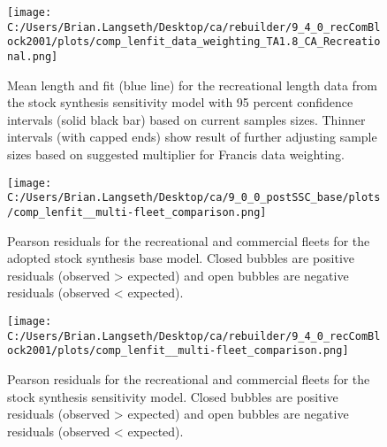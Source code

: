 \documentclass[11pt,
  english,
  letterpaper,
]{article}
\begin{document}
\tagmcend\tagstructend


\begin{figure}
\centering
\texttt{[image: C:/Users/Brian.Langseth/Desktop/ca/rebuilder/9\_4\_0\_recComBlock2001/plots/comp\_lenfit\_data\_weighting\_TA1.8\_CA\_Recreational.png]}
\caption{Mean length and fit (blue line) for the recreational length data from the stock synthesis sensitivity model with 95 percent confidence intervals (solid black bar) based on current samples sizes. Thinner intervals (with capped ends) show result of further adjusting sample sizes based on suggested multiplier for Francis data weighting.\label{fig:MeanLengthFit-rec-sens}}
\end{figure}

\tagmcend\tagstructend


\begin{figure}
\centering
\texttt{[image: C:/Users/Brian.Langseth/Desktop/ca/9\_0\_0\_postSSC\_base/plots/comp\_lenfit\_\_multi-fleet\_comparison.png]}
\caption{Pearson residuals for the recreational and commercial fleets for the adopted stock synthesis base model. Closed bubbles are positive residuals (observed \textgreater{} expected) and open bubbles are negative residuals (observed \textless{} expected).\label{fig:Pearson-base}}
\end{figure}

\tagmcend\tagstructend


\begin{figure}
\centering
\texttt{[image: C:/Users/Brian.Langseth/Desktop/ca/rebuilder/9\_4\_0\_recComBlock2001/plots/comp\_lenfit\_\_multi-fleet\_comparison.png]}
\caption{Pearson residuals for the recreational and commercial fleets for the stock synthesis sensitivity model. Closed bubbles are positive residuals (observed \textgreater{} expected) and open bubbles are negative residuals (observed \textless{} expected).\label{fig:Pearson-sens}}
\end{figure}

\tagmcend\tagstructend

\end{document}
